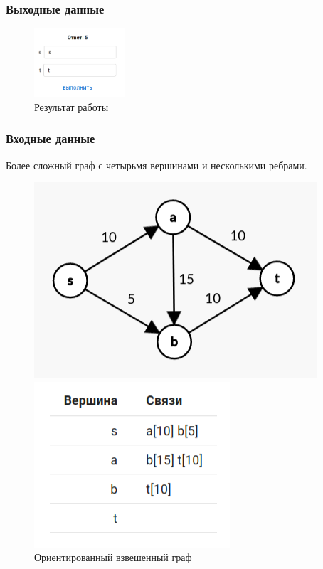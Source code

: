 \subsubsection{Выходные данные}
\begin{figure}[H]
  \centering\includegraphics[width=0.3\textwidth]{figs/task-11/res-ff-1.png}
  \caption{Результат работы}
\end{figure}

\subsubsection{Входные данные}
Более сложный граф с четырьмя вершинами и несколькими ребрами.
\begin{figure}[H]
  \begin{minipage}{0.5\textwidth}
    \centering\includegraphics[width=0.8\linewidth]{figs/task-11/graph-ff-2.png}
  \end{minipage}
  \begin{minipage}{0.5\textwidth}
    \centering\includegraphics[width=0.6\linewidth]{figs/task-11/adj-ff-2.png}
  \end{minipage}
  \caption{Ориентированный взвешенный граф}
\end{figure}

